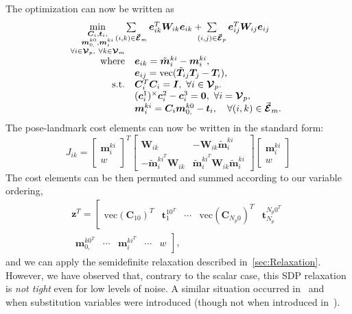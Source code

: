 \documentclass[lettersize,journal]{IEEEtran}
\newcommand{\EdgeSet}{\vec{\bm{\mathcal{E}}}}
\newcommand{\VertSetP}{\bm{\mathcal{V}}_p}
\newcommand{\VertSetM}{\bm{\mathcal{V}}_m}
\newcommand{\vect}[1]{\mbox{vec}(#1)}
\begin{document}
The optimization can now be written as
\begin{equation}
	\hspace*{-5pt}
	\label{opt:SLAM}
	\begin{array}{rl} 
		\min \limits_{ \substack{\bm{C}_i,\bm{t}_i, \\ \bm{m}_{0,}^{k0},\bm{m}_i^{ki} \\ \forall i\in \VertSetP,~ \forall k\in\VertSetM } } & \hspace*{-20pt}\sum\limits_{(i,k)\in\EdgeSet_m} \bm{e}_{ik}^T \bm{W}_{ik} \bm{e}_{ik} + \hspace*{-7pt}\sum\limits_{(i,j)\in\EdgeSet_p}  \bm{e}_{ij}^T \bm{W}_{ij} \bm{e}_{ij}\hfill \\
		\mbox{where} & \bm{e}_{ik} = \tilde{\bm{m}}_i^{ki} - \bm{m}_i^{ki},\\
		&\bm{e}_{ij} = \vect{\tilde{\bm{T}}_{ij}\bm{T}_j - \bm{T}_i},\\
		\mbox{s.t.}&\bm{C}_i^T \bm{C}_i = \bm{I},~\forall i \in \VertSetP.\\
		& (\bm{c}_i^{1})^\times\bm{c}_i^{2} - \bm{c}_i^{3} = \bm{0},~\forall i = \VertSetP,\\
		& \bm{m}_i^{ki} = \bm{C}_i\bm{m}_{0,}^{k0} - \bm{t}_i, \quad \forall (i,k)\in\EdgeSet_m.
	\end{array}
\end{equation}
The pose-landmark cost elements can now be written in the standard form:
\begin{equation*}
	J_{ik}=\begin{bmatrix}
		\bm{m}_i^{ki}\\w
	\end{bmatrix}^T \begin{bmatrix}
		\bm{W}_{ik} & -\bm{W}_{ik}\tilde{\bm{m}}_i^{ki}\\
		-\tilde{\bm{m}}_i^{ki^T}\bm{W}_{ik} & \tilde{\bm{m}}_i^{ki^T}\bm{W}_{ik}\tilde{\bm{m}}_i^{ki}
	\end{bmatrix}\begin{bmatrix}
	\bm{m}_i^{ki}\\w
	\end{bmatrix}
\end{equation*}
The cost elements can be then permuted and summed according to our variable ordering,
\begin{multline}
	\bm{z}^T = \left[\begin{matrix}\vect{\bm{C}_{10}}^T &\bm{t}_1^{10^T} & \cdots &\vect{\bm{C}_{N_p0}}^T&\bm{t}_{N_p}^{N_p0^T} \end{matrix}\right. \\
		\left.\begin{matrix} \bm{m}_{0,}^{k0^T} &\cdots& \bm{m}_i^{ki^T} & \cdots & w \end{matrix}\right],
\end{multline}
and we can apply the semidefinite relaxation described in~\ref{sec:Relaxation}. However, we have observed that, contrary to the scalar case, this SDP relaxation is \emph{not tight} even for low levels of noise. A similar situation occurred in~\cite{brialesCertifiablyGloballyOptimal2018} and~\cite{yangTEASERFastCertifiable2021} when substitution variables were introduced (though not when introduced in~\cite{dumbgenSafeSmoothCertified2023}).
\end{document}
